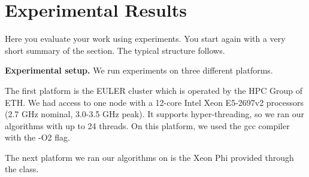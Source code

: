 \documentclass[letterpaper]{article}
\newcommand{\mypar}[1]{{\bf #1.}} %
\begin{document}
%	
%	
	
	
	
	
	\section{Experimental Results}\label{sec:exp}
	
	Here you evaluate your work using experiments. You start again with a
	very short summary of the section. The typical structure follows.
	
	\mypar{Experimental setup}
	We run experiments on three different platforms.
	
	The first platform is the EULER cluster which is operated by the HPC Group of ETH. 
	We had access to one node with a 12-core Intel Xeon E5-2697v2 processors (2.7 GHz nominal, 3.0-3.5 GHz peak). 
	It supports hyper-threading, so we ran our algorithms with up to 24 threads. 
	On this platform, we used the gcc compiler with the -O2 flag.
	
	The next platform we ran our algorithms on is the Xeon Phi provided through the class.
	
\end{document}
